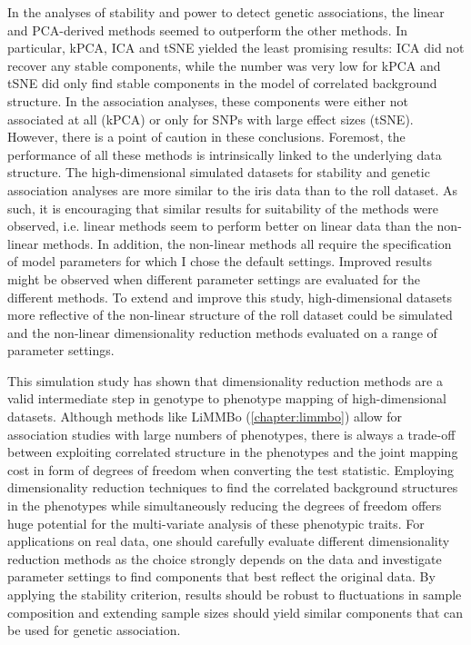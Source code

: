 In the analyses of stability and power to detect genetic associations, the linear and PCA-derived methods seemed to outperform the other methods. In particular, kPCA, ICA and tSNE yielded the least promising results: ICA did not recover any stable components, while the number was very low for kPCA and tSNE did only find stable components in the model of correlated background structure. In the association analyses, these components were either not associated at all (kPCA) or only for SNPs with large effect sizes (tSNE). However, there is a point of caution in these conclusions. Foremost, the performance of all these methods is intrinsically linked to the underlying data structure. The high-dimensional simulated datasets for stability and genetic association analyses are more similar to the iris data than to the roll dataset. As such, it is encouraging that similar results for suitability of the methods were observed, i.e. linear methods seem to perform better on linear data than the non-linear methods. In addition, the non-linear methods all require the specification of model parameters for which I chose the default settings. Improved results might be observed when different parameter settings are evaluated for the different methods. To extend and improve this study, high-dimensional datasets more reflective of the non-linear structure of the roll dataset could be simulated and the non-linear dimensionality reduction methods evaluated on a range of parameter settings. 

This simulation study has shown that dimensionality reduction methods are a valid intermediate step in genotype to phenotype mapping of high-dimensional datasets. Although methods like LiMMBo (\cref{chapter:limmbo}) allow for  association studies with large numbers of phenotypes, there is always a trade-off between exploiting correlated structure in the phenotypes and the joint mapping cost in form of degrees of freedom when converting the test statistic. Employing dimensionality reduction techniques to find the correlated background structures in the phenotypes while simultaneously reducing the degrees of freedom offers huge potential for the multi-variate analysis of these phenotypic traits. For applications on real data, one should carefully evaluate different dimensionality reduction methods as the choice strongly depends on the data and investigate parameter settings to find components that best reflect the original data. By applying the stability criterion, results should be robust to fluctuations in sample composition and extending sample sizes should yield similar components that can be used for genetic association. 



